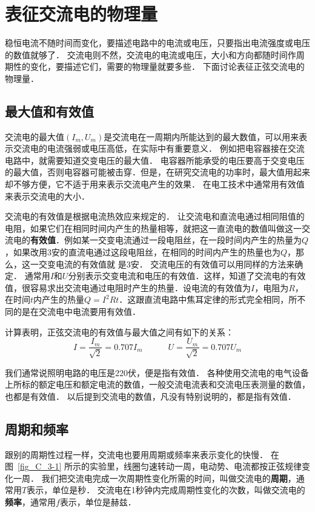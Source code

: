 \section{表征交流电的物理量}

稳恒电流不随时间而变化，要描述电路中的电流或电压，只要指出电流强度或电压的数值就够了．
交流电则不然，交流电的电流或电压，大小和方向都随时间作周期性的变化，要描述它们，需要的物理量就要多些．
下面讨论表征正弦交流电的物理量．

\subsection{最大值和有效值}

交流电的最大值$(I_m,U_m)$是交流电在一周期内所能达到的最大数值，可以用来表示交流电的电流强弱或电压高低，在实际中有重要意义．
例如把电容器接在交流电路中，就需要知道交变电压的最大值．
电容器所能承受的电压要高于交变电压的最大值，否则电容器可能被击穿．但是，在研究交流电的功率时，最大值用起来却不够方便，它不适于用来表示交流电产生的效果．
在电工技术中通常用有效值来表示交流电的大小．

交流电的有效值是根据电流热效应来规定的．
让交流电和直流电通过相同阻值的电阻，如果它们在相同时间内产生的热量相等，就把这一直流电的数值叫做这一交流电的\textbf{有效值}．例如某一交变电流通过一段电阻丝，在一段时间内产生的热量为$Q$，如果改用3安的直流电通过这段电阻丝，在相同的时间内产生的热量也为$Q$，那么，这一交变电流的有效值就
是3安．
交流电压的有效值可以用同样的方法来确定．
通常用$I$和$U$分别表示交变电流和电压的有效值．这样，知道了交流电的有效值，很容易求出交流电通过电阻时产生的热量．设电流的有效值为$I$，电阻为$R$，在时间$t$内产生的热量$Q=I^2Rt$．这跟直流电路中焦耳定律的形式完全相同，所不同的是在交流电中电流要用有效值．

计算表明，正弦交流电的有效值与最大值之间有如下的关系：
\[
   I=\frac{I_m}{\sqrt{2}}=0.707I_m
    \qquad  \quad 
   U=\frac{U_m}{\sqrt{2}}=0.707U_m 
\]

我们通常说照明电路的电压是220伏，便是指有效值．
各种使用交流电的电气设备上所标的额定电压和额定电流的数值，一般交流电流表和交流电压表测量的数值，也都是有效值．
以后提到交流电的数值，凡没有特别说明的，都是指有效值．

\subsection{周期和频率}

跟别的周期性过程一样，交流电也要用周期或频率来表示变化的快慢．
在图~\ref{fig_C_3-1} 所示的实验里，线圈匀速转动一周，电动势、电流都按正弦规律变化一周．
我们把交流电完成一次周期性变化所需的时间，叫做交流电的\textbf{周期}，通常用$T$表示，单位是秒．
交流电在1秒钟内完成周期性变化的次数，叫做交流电的\textbf{频率}，通常用$f$表示，单位是赫兹．

